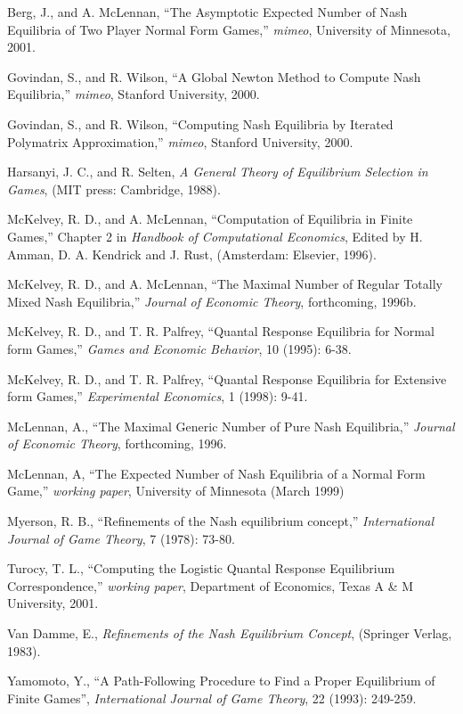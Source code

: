 \documentclass[12pt]{article}
\begin{document}
\begin{description}
\item
Berg, J., and A. McLennan, ``The Asymptotic Expected Number of Nash
Equilibria of Two Player Normal  Form Games,''  {\it mimeo},
University of Minnesota, 2001.

\item
Govindan, S., and R. Wilson, ``A Global Newton Method to Compute Nash
Equilibria,'' {\it mimeo}, Stanford University, 2000.  

\item
Govindan, S., and R. Wilson, ``Computing Nash Equilibria by Iterated
Polymatrix Approximation,'' {\it mimeo}, Stanford University, 2000.

\item
Harsanyi, J. C., and R. Selten, {\it A General Theory of Equilibrium
Selection in Games}, (MIT press: Cambridge, 1988).

\item
McKelvey, R. D., and A. McLennan, ``Computation of Equilibria in
Finite Games,'' Chapter 2 in {\it Handbook of Computational
Economics}, Edited by H. Amman, D. A. Kendrick and J. Rust,
(Amsterdam: Elsevier, 1996).

\item
McKelvey, R. D., and A. McLennan, ``The Maximal Number of Regular
Totally Mixed Nash Equilibria,'' {\it Journal of Economic Theory},
forthcoming, 1996b.

\item
McKelvey, R. D., and T. R. Palfrey, ``Quantal Response Equilibria for
Normal form Games,'' {\it Games and Economic Behavior}, 10 (1995):
6-38.

\item
McKelvey, R. D., and T. R. Palfrey, ``Quantal Response Equilibria for
Extensive form Games,'' {\it Experimental Economics}, 1 (1998): 9-41.

\item 
McLennan, A., ``The Maximal Generic Number of Pure Nash Equilibria,''
{\it Journal of Economic Theory}, forthcoming, 1996.

\item
McLennan, A, ``The Expected Number of Nash Equilibria of a
Normal Form Game,'' {\it working paper}, University of Minnesota
(March 1999)

\item
Myerson, R. B., ``Refinements of the Nash equilibrium concept,'' {\it
International Journal of Game Theory}, 7 (1978): 73-80.

\item
Turocy, T. L., ``Computing the Logistic Quantal Response Equilibrium
Correspondence,'' {\it working paper}, Department of Economics, Texas
A \& M University, 2001.

\item
Van Damme, E., {\it Refinements of the Nash Equilibrium Concept},
(Springer Verlag, 1983).

\item
Yamomoto, Y., ``A Path-Following Procedure to Find a Proper
Equilibrium of Finite Games'', {\it International Journal of Game
Theory}, 22 (1993): 249-259.
\end{description}
\end{document}
